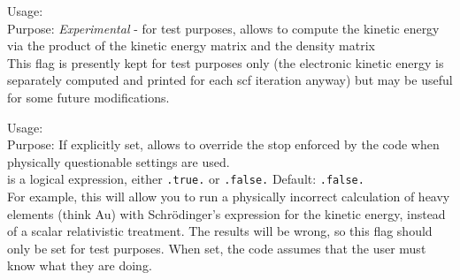 {
  \noindent
  Usage:  \\[1.0ex]
  Purpose: \emph{Experimental} - for test purposes, allows to compute the kinetic energy via
    the product of the kinetic energy matrix and the density matrix
    \\[1.0ex]
}
This flag is presently kept for test purposes only (the electronic
kinetic energy is separately computed and printed for each scf
iteration anyway) but may be useful for some future modifications.

{
  \noindent
  Usage:   \\[1.0ex]
  Purpose: If explicitly set, allows to override the stop enforced by
  the code when physically questionable 
  settings are used.  \\[1.0ex]
   is a logical expression, either \texttt{.true.} or
    \texttt{.false.} Default: \texttt{.false.} \\
}
For example, this will allow you to run a physically incorrect
calculation of heavy elements (think Au) with Schr\"odinger's
expression for the kinetic energy, instead of a scalar relativistic
treatment. The results will be wrong, so this flag should only be set
for test purposes. When set, the code assumes that the user must know
what they are doing.

